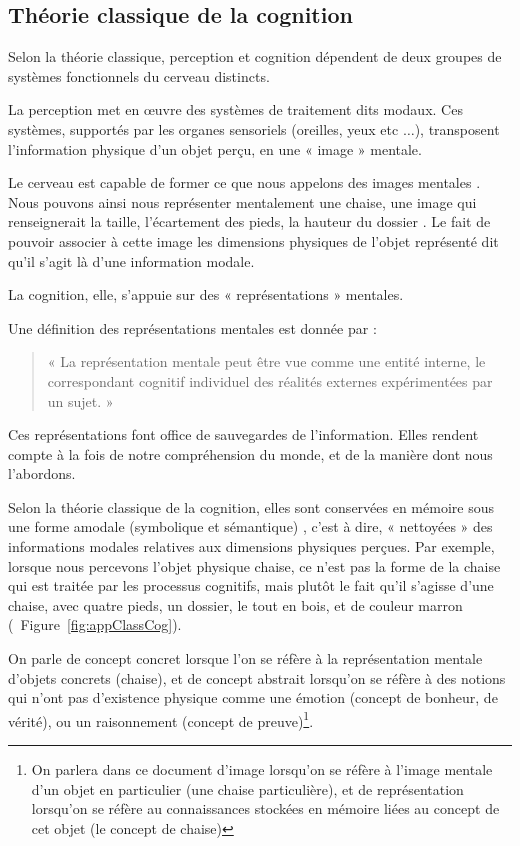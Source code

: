 \subsection{Théorie classique de la cognition}
\label{sec:ch3_classicCognition}

Selon la théorie classique, perception et cognition dépendent de deux groupes de systèmes fonctionnels du cerveau distincts. 

La perception met en œuvre des systèmes de traitement dits modaux. Ces systèmes, supportés par les organes sensoriels (oreilles, yeux etc $\ldots$), transposent l'information physique d'un objet perçu, en une « image » mentale.

Le cerveau est capable de former ce que nous appelons des images mentales \citep{barsalou2003situated,martin2001functional}. Nous pouvons ainsi nous représenter mentalement une chaise, une image qui renseignerait la taille, l'écartement des pieds, la hauteur du dossier \etc. Le fait de pouvoir associer à cette image les dimensions physiques de l'objet représenté dit qu'il s'agit là d'une information modale.

La cognition, elle, s'appuie sur des « représentations » mentales.

Une définition des représentations mentales est donnée par \citep{houde1998vocabulaire}:

\begin{quote}
« La représentation mentale peut être vue comme une entité interne, le correspondant cognitif individuel des réalités externes expérimentées par un sujet. »
\end{quote}

Ces représentations font office de sauvegardes de l'information. Elles rendent compte à la fois de notre compréhension du monde, et de la manière dont nous l'abordons. 

Selon la théorie classique de la cognition, elles sont conservées en mémoire sous une forme amodale (symbolique et sémantique) \citep[p. 357]{mcadams1994penser}, c'est à dire, « nettoyées » des informations modales relatives aux dimensions physiques perçues. Par exemple, lorsque nous percevons l'objet physique chaise, ce n'est pas la forme de la chaise qui est traitée par les processus cognitifs, mais plutôt le fait qu'il s'agisse d'une chaise, avec quatre pieds, un dossier, le tout en bois, et de couleur marron (\cf~Figure~\ref{fig:appClassCog}).
 
On parle de concept concret lorsque l'on se réfère à la représentation mentale d'objets concrets (chaise), et de concept abstrait lorsqu'on se réfère à des notions qui n'ont pas d'existence physique comme une émotion (concept de bonheur, de vérité), ou un raisonnement (concept de preuve)\footnote{On parlera dans ce document d'image lorsqu'on se réfère à l'image mentale d'un objet en particulier (une chaise particulière), et de représentation lorsqu'on se réfère au connaissances stockées en mémoire liées au concept de cet objet (le concept de chaise)}.
 
